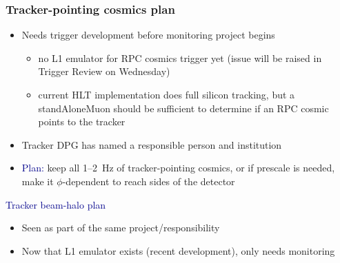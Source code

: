 \documentclass[compress]{beamer}
\begin{document}
\begin{frame}
\frametitle{Tracker-pointing cosmics plan}

\begin{itemize}
\item Needs trigger development before monitoring project begins
\begin{itemize}
\item no L1 emulator for RPC cosmics trigger yet (issue will be raised in Trigger Review on Wednesday)

\item current HLT implementation does full silicon tracking, but a
  standAloneMuon should be sufficient to determine if an RPC cosmic
  points to the tracker

\end{itemize}

\item Tracker DPG has named a responsible person and institution

\item \textcolor{darkblue}{Plan:} keep all 1--2~Hz of tracker-pointing
  cosmics, or if prescale is needed, make it $\phi$-dependent to reach
  sides of the detector

\end{itemize}

\vspace{0.5 cm}
\hspace{-0.83 cm} \textcolor{darkblue}{\Large Tracker beam-halo plan}

\vspace{0.1 cm}
\begin{itemize}
\item Seen as part of the same project/responsibility
\item Now that L1 emulator exists (recent development), only needs monitoring
\end{itemize}




\end{frame}
\end{document}

